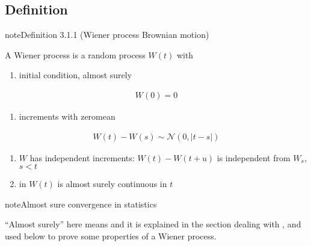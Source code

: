 \documentclass[letterpaper,10pt,english]{jupyterBook}
\begin{document}
\subsection{Definition}
\label{\detokenize{ch/prob/wiener:definition}}\label{\detokenize{ch/prob/wiener:prob-processes-wiener-def}}\label{ch/prob/wiener:wiener:def}
\begin{sphinxadmonition}{note}{Definition 3.1.1 (Wiener process \sphinxhyphen{} Brownian motion)}



\sphinxAtStartPar
A Wiener process is a random process \(W(t)\) with
\begin{enumerate}
%
\item {} 
\sphinxAtStartPar
initial condition, almost surely

\end{enumerate}
\begin{equation*}
\begin{split}W(0) = 0\end{split}
\end{equation*}\begin{enumerate}
%
\setcounter{enumi}{1}
\item {} 
\sphinxAtStartPar
increments with zero\sphinxhyphen{}mean {\hyperref[\detokenize{ch/prob/rv-continuous:prob-rv-continuous-ex-normal}]{}}

\end{enumerate}
\begin{equation*}
\begin{split}W(t) - W(s) \sim \mathscr{N}(0,|t-s|)\end{split}
\end{equation*}\begin{enumerate}
%
\setcounter{enumi}{2}
\item {} 
\sphinxAtStartPar
\(W\) has independent increments: \(W(t) - W(t+u)\) is independent from \(W_s\), \(s < t\)

\item {} 
\sphinxAtStartPar
in \(W(t)\) is almost surely continuous in \(t\)

\end{enumerate}
\end{sphinxadmonition}

\begin{sphinxadmonition}{note}{Almost sure convergence in statistics}

\sphinxAtStartPar
“Almost surely” here means {\hyperref[\detokenize{ch/prob/convergence:prob-convergence-strong}]{}} and it is explained in the section dealing with {\hyperref[\detokenize{ch/prob/convergence:prob-convergence}]{}}, and used below to prove some properties of a Wiener process.
\end{sphinxadmonition}
\end{document}
